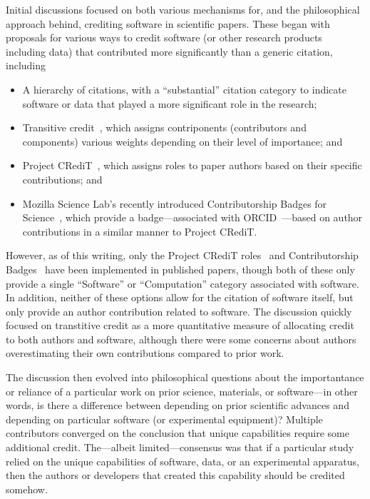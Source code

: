 Initial discussions focused on both various mechanisms for, and the philosophical approach behind, crediting software in scientific papers.
These began with proposals for various ways to credit software (or other research products including data) that contributed more significantly than a generic citation, including
\begin{itemize}
    \item A hierarchy of citations, with a ``substantial'' citation category to indicate software or data that played a more significant role in the research;
    \item Transitive credit~\cite{wssspe2_katz,Katz:2014_tc}, which assigns contriponents (contributors and components) various weights depending on their level of importance; and
    \item Project CRediT~\cite{projectcredit}, which assigns roles to paper authors based on their specific contributions; and
    \item Mozilla Science Lab's recently introduced Contributorship Badges for Science~\cite{Mozilla_badges}, which provide a badge---associated with ORCID~\cite{orcid}---based on author contributions in a similar manner to Project CRediT.
\end{itemize}
However, as of this writing, only the Project CRediT roles~\cite{McCall2015_credit,Lin2015_credit} and Contributorship Badges~\cite{Mozilla_badges} have been implemented in published papers, though both of these only provide a single ``Software'' or ``Computation'' category associated with software.
In addition, neither of these options allow for the citation of software itself, but only provide an author contribution related to software.
The discussion quickly focused on transtitive credit as a more quantitative measure of allocating credit to both authors and software, although there were some concerns about authors overestimating their own contributions compared to prior work.

The discussion then evolved into philosophical questions about the importantance or reliance of a particular work on prior science, materials, or software---in other words, is there a difference between depending on prior scientific advances and depending on particular software (or experimental equipment)?
Multiple contributors converged on the conclusion that unique capabilities require some additional credit.
The---albeit limited---consensus was that if a particular study relied on the unique capabilities of software, data, or an experimental apparatus, then the authors or developers that created this capability should be credited somehow.

